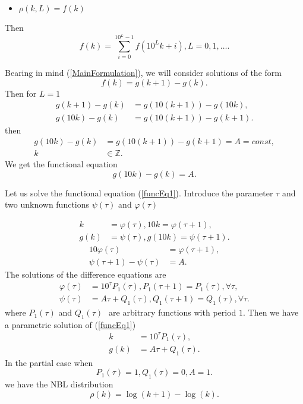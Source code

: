 \documentclass[titlepage,fleqn]{article}%
\providecommand{\U}[1]{\protect\rule{.1in}{.1in}}
\begin{document}
\begin{itemize}
\item $\rho(k,L)=f(k)$
\end{itemize}

Then%
\begin{equation}
f(k)=%
{\displaystyle\sum\limits_{i=0}^{10^{L}-1}}
f(10^{L}k+i),L=0,1,\ldots. \label{SolEq2}%
\end{equation}


Bearing in mind (\ref{MainFormulation}), we will consider solutions of the
form%
\begin{equation}
f(k)=g(k+1)-g(k). \label{Sdiff1}%
\end{equation}
Then for $L=1$
\begin{align*}
g(k+1)-g(k)  &  =g(10(k+1))-g(10k),\\
g(10k)-g(k)  &  =g(10(k+1))-g(k+1).
\end{align*}
then
\begin{align*}
g(10k)-g(k)  &  =g(10(k+1))-g(k+1)=A=const,\\
k  &  \in%
\mathbb{Z}
.
\end{align*}
We get the functional equation
\begin{equation}
g(10k)-g(k)=A. \label{funcEq1}%
\end{equation}


Let us solve the functional equation (\ref{funcEq1}). Introduce the parameter
$\tau$ and two unknown functions $\psi(\tau)$ and $\varphi(\tau)$%

\begin{align}
k  &  =\varphi(\tau),10k=\varphi(\tau+1),\label{Fun1}\\
g(k)  &  =\psi(\tau),g(10k)=\psi(\tau+1).\nonumber
\end{align}%
\begin{align}
10\varphi(\tau)  &  =\varphi(\tau+1),\label{Fun2}\\
\psi(\tau+1)-\psi(\tau)  &  =A.\nonumber
\end{align}
The solutions of the difference equations are%
\begin{align*}
\varphi(\tau)  &  =10^{\tau}P_{1}(\tau),P_{1}(\tau+1)=P_{1}(\tau),\forall
\tau,\\
\psi(\tau)  &  =A\tau+Q_{1}(\tau),Q_{1}(\tau+1)=Q_{1}(\tau),\forall\tau.
\end{align*}
where $P_{1}(\tau)$ and $Q_{1}(\tau)\ $\ are arbitrary functions with period
$1$. Then we have a parametric solution of (\ref{funcEq1})%
\begin{align}
k  &  =10^{\tau}P_{1}(\tau),\label{Param1}\\
g(k)  &  =A\tau+Q_{1}(\tau).\nonumber
\end{align}
In the partial case when
\[
P_{1}(\tau)=1,Q_{1}(\tau)=0,A=1.
\]
we have the NBL distribution%
\begin{equation}
\rho(k)=\log(k+1)-\log(k).
\end{equation}
\end{document}
